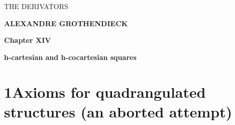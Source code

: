 \printedpage{}%

\begin{center}
\vspace*{6cm}

{\LARGE \textsf{THE DERIVATORS}}

\vspace{1cm}

{\large \textbf{ALEXANDRE GROTHENDIECK}}

\vspace{2cm}

{\large \textbf{Chapter XIV}}

\vspace{0.3cm}

{\large \textbf{h-cartesian and h-cocartesian squares}}
\end{center}

\clearpage

\printedpage{}%

\vspace*{6cm}


\clearpage



\section*{1\quad Axioms for quadrangulated structures (an aborted attempt)}

